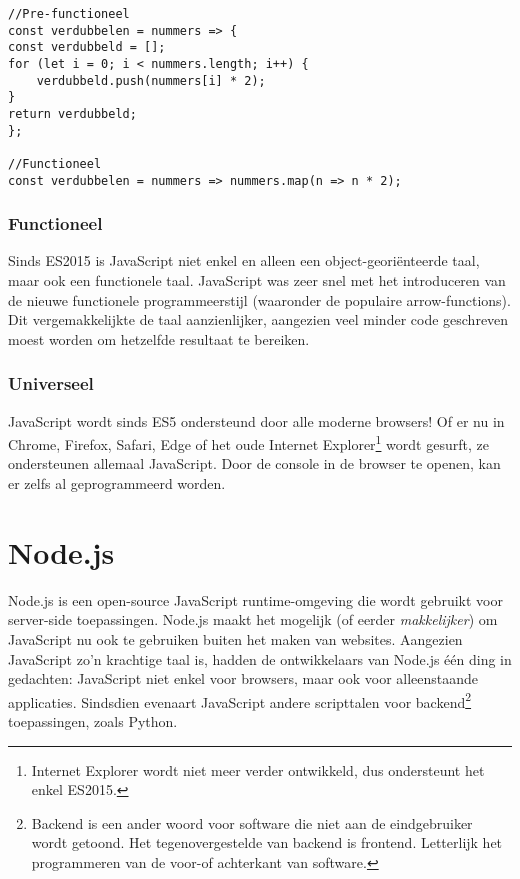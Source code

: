 \begin{lstlisting}[style=ES6,
caption={Functionele programmeerstijl.},
label=code:func]
//Pre-functioneel
const verdubbelen = nummers => {
const verdubbeld = [];
for (let i = 0; i < nummers.length; i++) {
	verdubbeld.push(nummers[i] * 2);
}
return verdubbeld;
};

//Functioneel
const verdubbelen = nummers => nummers.map(n => n * 2);
\end{lstlisting}

\subsubsection{Functioneel}
\label{sec:functional}

Sinds ES2015 is JavaScript niet enkel en alleen een object-georiënteerde taal, maar ook een functionele taal. JavaScript was zeer snel met het introduceren van de nieuwe functionele programmeerstijl (waaronder de populaire arrow-functions). Dit vergemakkelijkte de taal aanzienlijker, aangezien veel minder code geschreven moest worden om hetzelfde resultaat te bereiken.

\subsubsection{Universeel}
\label{sec:universal}

JavaScript wordt sinds ES5 ondersteund door alle moderne browsers! Of er nu in Chrome, Firefox, Safari, Edge of het oude Internet Explorer\footnote{Internet Explorer wordt niet meer verder ontwikkeld, dus ondersteunt het enkel ES2015.} wordt gesurft, ze ondersteunen allemaal JavaScript. Door de console in de browser te openen, kan er zelfs al geprogrammeerd worden.




\section{Node.js}
\label{sec:nodeJs}

Node.js is een open-source JavaScript runtime-omgeving die wordt gebruikt voor server-side toepassingen. Node.js maakt het mogelijk (of eerder \textit{makkelijker}) om JavaScript nu ook te gebruiken buiten het maken van websites. Aangezien JavaScript zo'n krachtige taal is, hadden de ontwikkelaars van Node.js één ding in gedachten: JavaScript niet enkel voor browsers, maar ook voor alleenstaande applicaties. Sindsdien evenaart JavaScript andere scripttalen voor backend\footnote{Backend is een ander woord voor software die niet aan de eindgebruiker wordt getoond. Het tegenovergestelde van backend is frontend. Letterlijk het programmeren van de voor-of achterkant van software. } toepassingen, zoals Python. \textcite{Patel2018}

